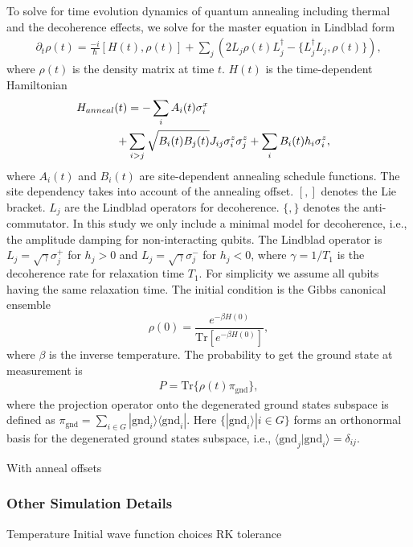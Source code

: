 \documentclass[prd,twocolumn,tightenlines,preprintnumbers,showpacs,superscriptaddress,notitlepage,nofootinbib,eqsecnum,floatfix,longbibliography]{revtex4}
\begin{document}
{\color{blue}


To solve for time evolution dynamics of quantum annealing including thermal and the decoherence effects, we solve for the master equation in Lindblad form
\begin{align}
\partial_t \rho (t) =  \frac{-i}{\hbar} [H(t) , \rho(t)] + \sum_j (2L_j \rho(t) L_j^\dagger - \{ L^\dagger_j L_j, \rho(t) \}) ,
\end{align}
where $\rho (t)$ is the density matrix at time $t$. $H(t)$ is the time-dependent Hamiltonian 
\begin{align}
\label{eq:annealH}
 H_{anneal}(t)&  =  - \sum_i  A_i(t)\sigma^x_i & \notag \\ 
 +&  \sum_{i>j} \sqrt{B_{i}(t)B_{j}(t)} J_{ij} \sigma^z_i \sigma^z_j +\sum_i B_{i}(t) h_i \sigma^z_i  ,&
\end{align}
where $A_i(t)$ and $B_{i}(t)$ are site-dependent annealing schedule functions. The site dependency takes into account of the annealing offset. $[,]$ denotes the Lie bracket. $L_j$ are the Lindblad operators for decoherence. $\{, \}$ denotes the anti-commutator. In this study we only include a minimal model for decoherence, i.e., the amplitude damping for non-interacting qubits. The Lindblad operator is $L_j=\sqrt{\gamma} \sigma^{+}_j$ for $h_j>0$ and $L_j=\sqrt{\gamma} \sigma^{-}_j$ for $h_j<0$, where $\gamma = 1/T_1$ is the decoherence rate for relaxation time $T_1$. For simplicity we assume all qubits having the same relaxation time. The initial condition is the Gibbs canonical ensemble
\begin{equation}
\rho (0) =  \frac{e^{-\beta H(0)}}{\mbox{Tr}[e^{-\beta H(0)}]} ,
\end{equation}
where $\beta$ is the inverse temperature.
The probability to get the ground state at measurement is
\begin{align}
P =  \mbox{Tr} \{  \rho (t) \pi_{\mbox{gnd}} \}  ,
\end{align}
where the projection operator onto the degenerated ground states subspace is defined as $\pi_{\mbox{gnd}}=\sum_{i\in G} |\mbox{gnd}_i\rangle \langle \mbox{gnd}_i| $. Here $\{ | \mbox{gnd}_i \rangle | i \in G \}$ forms an orthonormal basis for the degenerated ground states subspace, i.e., $\langle \mbox{gnd}_j | \mbox{gnd}_i \rangle = \delta_{ij}$.





}

With anneal offsets

\subsubsection{Other Simulation Details}
Temperature
Initial wave function choices
RK tolerance
\end{document}
